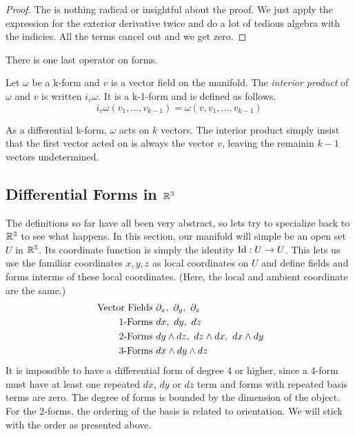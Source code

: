\documentclass[fleqn,letterpaper]{report}
\begin{document}
\begin{proof}
The is nothing radical or insightful about the proof. We just
apply the expression for the exterior derivative twice and do
a lot of tedious algebra with the indicies. All the terms
cancel out and we get zero.
\end{proof}

There is one last operator on forms.

\begin{defn}
Let $\omega$ be a k-form and $v$ is a vector field on
the manifold. The \emph{interior product} of $\omega$ and $v$
is written $i_v \omega$. It is a k-1-form and is defined as
follows.
\begin{equation*}
i_v \omega (v_1, \ldots, v_{k-1}) = \omega(v,v_1, \ldots,
v_{k-1})
\end{equation*}
\end{defn}

As a differential k-form, $\omega$ acts on $k$ vectors. The
interior product simply insist that the first vector acted on
is always the vector $v$, leaving the remainin $k-1$ vectors
undetermined. 

\subsection{Differential Forms in $\mathbb{R}^3$}
\label{differential-forms-r3}

The definitions so far have all been very abstract, so lets
try to specialize back to $\mathbb{R}^3$ to see what happens. In this
section, our manifold will simple be an open set $U$ in
$\mathbb{R}^3$. Its coordinate function is simply the identity $\mathrm{Id}:
U \rightarrow U$. This lets us use the familiar coordinates
$x,y,z$ as local coordinates on $U$ and define fields and
forms interms of these local coordinates. (Here, the local and
ambient coordinate are the same.)
\begin{align*}
\text{ Vector Fields } & \partial_x,\ \partial_y,\ \partial_z \\
\text{ 1-Forms } & dx,\ dy,\ dz \\
\text{ 2-Forms } & dy \wedge dz,\ dz \wedge dx,\ dx \wedge dy \\
\text{ 3-Forms } & dx \wedge dy \wedge dz
\end{align*}
It is impossible to have a differential form of degree 4 or
higher, since a 4-form must have at least one repeated $dx$,
$dy$ or $dz$ term and forms with repeated basis terms are
zero. The degree of forms is bounded by the dimension of the
object. For the 2-forms, the ordering of the basis is related
to orientation. We will stick with the order as presented
above.
\end{document}
